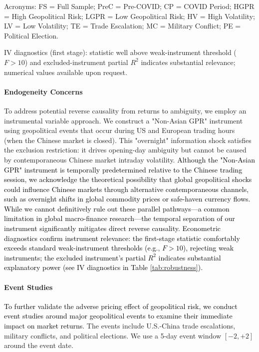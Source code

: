 \documentclass[preprint,12pt,authoryear]{elsarticle}
\begin{document}
\begin{table}[htbp]
\begin{threeparttable}
\begin{tablenotes}[flushleft]
\item[] Acronyms: FS = Full Sample; PreC = Pre-COVID; CP = COVID Period; HGPR = High Geopolitical Risk; LGPR = Low Geopolitical Risk; HV = High Volatility; LV = Low Volatility; TE = Trade Escalation; MC = Military Conflict; PE = Political Election.
\item[] IV diagnostics (first stage): statistic well above weak-instrument threshold ($F>10$) and excluded-instrument partial $R^2$ indicates substantial relevance; numerical values available upon request.
\end{tablenotes}
\end{threeparttable}
\end{table}

\paragraph{Endogeneity Concerns} To address potential reverse causality from returns to ambiguity, we employ an instrumental variable approach. We construct a "Non-Asian GPR" instrument using geopolitical events that occur during US and European trading hours (when the Chinese market is closed). This "overnight" information shock satisfies the exclusion restriction: it drives opening-day ambiguity but cannot be caused by contemporaneous Chinese market intraday volatility. \textcolor{black}{Although the "Non-Asian GPR" instrument is temporally predetermined relative to the Chinese trading session, we acknowledge the theoretical possibility that global geopolitical shocks could influence Chinese markets through alternative contemporaneous channels, such as overnight shifts in global commodity prices or safe-haven currency flows. While we cannot definitively rule out these parallel pathways—a common limitation in global macro-finance research—the temporal separation of our instrument significantly mitigates direct reverse causality. Econometric diagnostics confirm instrument relevance: the first-stage statistic comfortably exceeds standard weak-instrument thresholds (e.g., $F>10$), rejecting weak instruments; the excluded instrument’s partial $R^2$ indicates substantial explanatory power (see IV diagnostics in Table \ref{tab:robustness}).}


\paragraph{Event Studies} \textcolor{black}{To further validate the adverse pricing effect of geopolitical risk, we conduct event studies around major geopolitical events to examine their immediate impact on market returns.} The events include U.S.-China trade escalations, military conflicts, and political elections. We use a 5-day event window $[-2, +2]$ around the event date.
\end{document}
